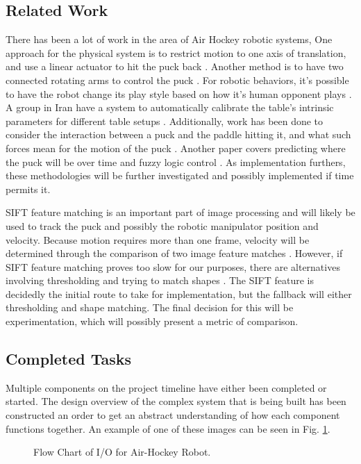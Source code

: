 \documentclass[letterpaper, 10 pt, conference]{ieeeconf}
\begin{document}
\subsection{Related Work}
\label{relatedwork}
There has been a  lot of work in the area of Air Hockey robotic systems, One approach for the physical system is to restrict motion to one axis of translation, and use a linear actuator to hit the puck back \cite{marra}. Another method is to have two connected rotating arms to control the puck \cite{bishop}. For robotic behaviors, it’s possible to have the robot change its play style based on how it’s human opponent plays \cite{namiki}. A group in Iran have a system to automatically calibrate the table’s intrinsic parameters for different table setups \cite{alizadeh}. Additionally, work has been done to consider the interaction between a puck and the paddle hitting it, and what such forces mean for the motion of the puck \cite{ghazvini} \cite{iguchi}. Another paper covers predicting where the puck will be over time and fuzzy logic control \cite{wang}.  As implementation furthers, these methodologies will be further investigated and possibly implemented if time permits it.

SIFT feature matching is an important part of image processing and will likely be used to track the puck and possibly the robotic manipulator position and velocity. Because motion requires more than one frame, velocity will be determined through the comparison of two image feature matches \cite{rahman}. However, if SIFT feature matching proves too slow for our purposes, there are alternatives involving thresholding and trying to match shapes \cite{wang} \cite{marra} \cite{bishop}. The SIFT feature is decidedly the initial route to take for implementation, but the fallback will either thresholding and shape matching.  The final decision for this will be experimentation, which will possibly present a metric of comparison.
\subsection{Completed Tasks}
Multiple components on the project timeline have either been completed or started.  The design overview of the complex system that is being built has been constructed an order to get an abstract understanding of how each component functions together.  An example of one of these images can be seen in Fig. \ref{5551process}.

\begin{figure}[!h]
\centering
{}
\caption{Flow Chart of I/O for Air-Hockey Robot.}
\label{5551process}
\end{figure}
\end{document}
